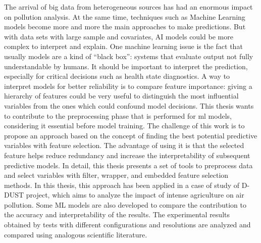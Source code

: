 
The arrival of big data from heterogeneous sources has had an enormous impact on pollution analysis.
At the same time, techniques such as Machine Learning models become more and more the main approaches to make predictions.
But with data sets with large sample and covariates, AI models could be more complex to interpret and explain.
One machine learning issue is the fact that usually models are a kind of “black box”: systems that evaluate output not fully understandable by humans. 
It should be important to interpret the prediction, especially for critical decisions such as health state diagnostics.
A way to interpret models for better reliability is to compare feature importance: giving a hierarchy of features could be very useful to distinguish the most influential variables from the ones which could confound model decisions.
This thesis wants to contribute to the preprocessing phase that is performed for \gls{ml} models, considering it essential before model training.
The challenge of this work is to propose an approach based on the concept of finding the best potential predictive variables with feature selection.
The advantage of using it is that the selected feature helps reduce redundancy and increase the interpretability of subsequent predictive models.
In detail, this thesis presents a set of tools to preprocess data and select variables with filter, wrapper, and embedded feature selection methods.
In this thesis, this approach has been applied in a case of study of D-DUST project, which aims to analyze the impact of intense agriculture on air pollution.
Some ML models are also developed to compare the contribution to the accuracy and interpretability of the results.
The experimental results obtained by tests with different configurations and resolutions are analyzed and compared using analogous scientific literature.
\\
\\